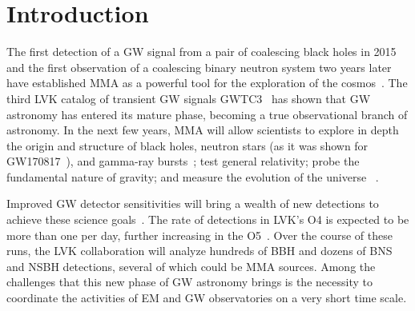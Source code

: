 \section{Introduction\label{intro}}

The first detection of a \ac{GW} signal from a pair of coalescing black holes in 2015 and the first observation of a coalescing binary neutron system two years later
have established \ac{MMA} as a powerful tool for the exploration of the cosmos~\cite{LIGOScientific:2016aoc,LIGOScientific:2017vwq}. The third \ac{LVK} catalog of transient \ac{GW} signals \ac{GWTC3}~\cite{LIGOScientific:2021djp}
has shown that \ac{GW} astronomy has entered its mature phase, becoming a true observational branch of astronomy. In the next few years, \ac{MMA} will allow scientists
to explore in depth the origin and structure of black holes, neutron stars (as it was shown for GW170817~\cite{LIGOScientific:2018cki}), and gamma-ray bursts~\cite{Ciolfi:2018tal}; test general relativity; probe the fundamental nature of gravity; and
measure the evolution of the universe~\cite{LIGOScientific:2021sio,LIGOScientific:2021psn,LIGOScientific:2021aug} . 

Improved \ac{GW} detector sensitivities will bring a wealth of new detections to achieve these science goals~\cite{LIGOScientific:2014pky,VIRGO:2014yos}. The rate
of detections in \ac{LVK}'s \ac{O4} is expected to be more than one per day, further increasing in the \ac{O5}~\cite{KAGRA:2013rdx}. Over the course of
these runs, the \ac{LVK} collaboration will analyze hundreds of \ac{BBH} and dozens of \ac{BNS} and \ac{NSBH} detections, several of which could be \ac{MMA} sources. Among the
challenges that this new phase of \ac{GW} astronomy brings is the necessity to coordinate the activities of \ac{EM} and \ac{GW} observatories on a very short time
scale. 


